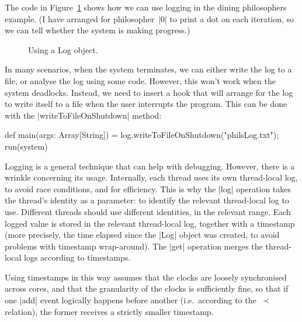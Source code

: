 The code in Figure~\ref{fig:dining-phils-log} shows how we can use logging in
the dining philosophers example.  (I have arranged for philosopher~|0| to
print a dot on each iteration, so we can tell whether the system is making
progress.)


\begin{figure}
\caption{Using a {\scalashape Log} object.}
\label{fig:dining-phils-log}
\end{figure}


In many scenarios, when the system terminates, we can either write the log to
a file, or analyse the log using some code.  However, this won't work when the
system deadlocks.  Instead, we need to insert a hook that will arrange for the
log to write itself to a file when the user interrupts the program.  This can
be done with the |writeToFileOnShutdown| method:
%
\begin{scala}
  def main(args: Array[String]) = {
    log.writeToFileOnShutdown("philsLog.txt"); run(system)
  }
\end{scala}

Logging is a general technique that can help with debugging.  However, there
is a wrinkle concerning its usage.
%
Internally, each thread uses its own thread-local log, to avoid race
conditions, and for efficiency.  This is why the |log| operation takes the
thread's identity as a parameter: to identify the relevant thread-local log to
use.  Different threads should use different identities, in the relevant
range.  Each logged value is stored in the relevant thread-local log, together
with a timestamp (more precisely, the time elapsed since the |Log| object was
created, to avoid problems with timestamp wrap-around).
%
The |get| operation merges the thread-local logs according to
timestamps.

Using timestamps in this way assumes that the clocks are loosely synchronised
across cores, and that the granularity of the clocks is sufficiently fine, so
that if one |add| event logically happens before another (i.e.~according to
the~$\prec$ relation), the former receives a strictly smaller timestamp.


